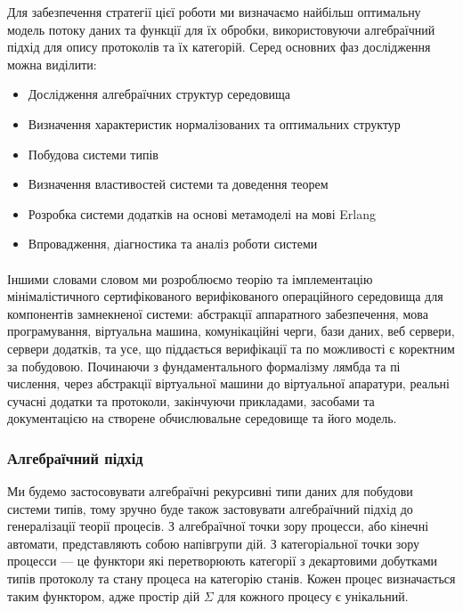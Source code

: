 \documentclass[11pt,oneside]{article}
\begin{document}
  Для забезпечення стратегії цієї роботи ми визначаємо найбільш оптимальну модель
  потоку даних та функції для їх обробки, використовуючи алгебраїчний підхід
  для опису протоколів та їх категорій. Серед основних фаз дослідження можна виділити:

\begin{itemize}
   \item Дослідження алгебраїчних структур середовища
   \item Визначення характеристик нормалізованих та оптимальних структур
   \item Побудова системи типів
   \item Визначення властивостей системи та доведення теорем
   \item Розробка системи додатків на основі метамоделі на мові Erlang
   \item Впровадження, діагностика та аналіз роботи системи
\end{itemize}

   \paragraph{}
   Іншими словами словом ми розроблюємо теорію та імплементацію мінімалістичного
   сертифікованого верифікованого операційного середовища для компонентів замнекненої системи:
   абстракції аппаратного забезпечення, мова програмування, віртуальна машина, комунікаційні
   черги, бази даних, веб сервери, сервери додатків, та усе, що піддається верифікації та по
   можливості є коректним за побудовою. Починаючи з фундаментального формалізму лямбда та пі числення,
   через абстракції віртуальної машини до віртуальної апаратури, реальні сучасні додатки та протоколи,
   закінчуючи прикладами, засобами та документацією на створене обчислювальне середовище та його модель.\\

\newpage
   \subsubsection{Алгебраїчний підхід}

   Ми будемо застосовувати алгебраїчні рекурсивні типи даних для побудови системи типів, тому
   зручно буде також застовувати алгебраїчний підхід до генералізації теорії процесів.
   З алгебраїчної точки зору процесси, або кінечні автомати, представляють собою напівгрупи дій.
   З категоріальної точки зору процесси --- це функтори які перетворюють категорії з декартовими добутками
   типів протоколу та стану процеса на категорію станів. Кожен процес визначається таким функтором, адже
   простір дій $\Sigma$ для кожного процесу є унікальний.
\end{document}
